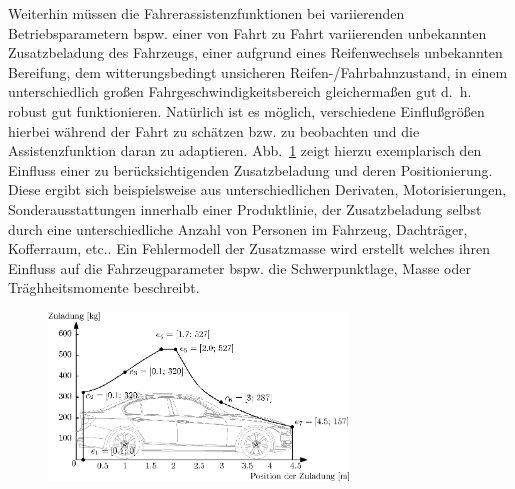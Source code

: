 Weiterhin müssen die Fahrerassistenzfunktionen bei variierenden Betriebsparametern bspw. einer von Fahrt zu Fahrt variierenden unbekannten Zusatzbeladung des Fahrzeugs, einer aufgrund eines Reifenwechsels unbekannten Bereifung, dem witterungsbedingt unsicheren Reifen-/Fahrbahnzustand, in einem unterschiedlich großen Fahrgeschwindigkeitsbereich gleichermaßen gut d.~h. robust gut funktionieren. Natürlich ist es möglich, verschiedene Einflußgrößen hierbei während der Fahrt zu schätzen bzw. zu beobachten und die Assistenzfunktion daran zu adaptieren.  
Abb.~\ref{fig:m_vert} zeigt hierzu exemplarisch den Einfluss einer zu berücksichtigenden Zusatzbeladung und deren Positionierung. Diese ergibt sich beispielsweise aus unterschiedlichen Derivaten, Motorisierungen, Sonderausstattungen innerhalb einer Produktlinie, der Zusatzbeladung selbst durch eine unterschiedliche Anzahl von Personen im Fahrzeug, Dachträger, Kofferraum, etc.. Ein Fehlermodell der Zusatzmasse wird erstellt welches ihren Einfluss auf die Fahrzeugparameter bspw. die Schwerpunktlage, Masse oder Träghheitsmomente beschreibt.  
\begin{figure}[htp!]
\centering
\includegraphics[width=8cm]{Bilder/01/massen_verteilung_f30.eps}
\label{fig:m_vert}
\end{figure}




